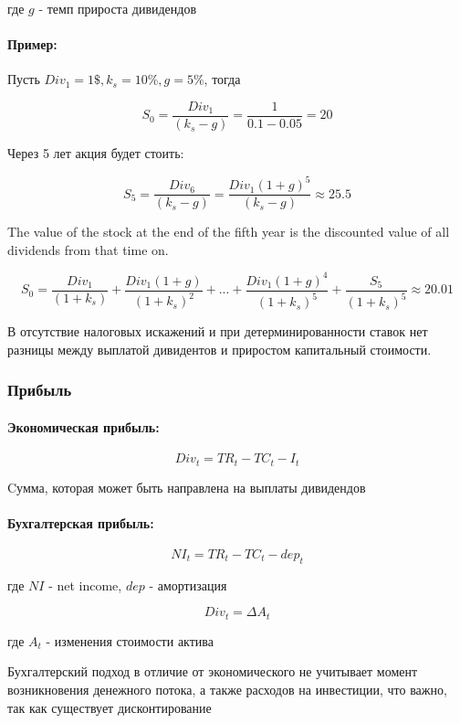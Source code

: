 \documentclass[a4paper,12pt]{article} %
\begin{document}
   где 
  $ g $  - темп  прироста дивидендов
  
  
  \paragraph{ Пример: }
  
  Пусть  $ Div_1 = 1 \$, k_s = 10 \%, g = 5 \%  $, тогда
  
   \[ S_0 = \dfrac{Div_1}{(k_s-g)} =  \dfrac{1 }{0.1-0.05} = 20 \]
  
  Через 5 лет акция будет стоить:
  
  \[ S_5 = \dfrac{Div_6}{(k_s-g)}  = \dfrac{Div_1(1+g)^5}{(k_s-g)}  \approx 25.5 \]
  
  The value of the stock at the end of the fifth year is the discounted value of all dividends
  from that time on.
  
  \[ S_0 =  \dfrac{Div_1}{(1 + k_s)} +  \dfrac{Div_1(1+g)}{(1+ k_s)^2} + ... +  \dfrac{Div_1(1+g)^4}{(1+ k_s)^5}  + \dfrac{S_5}{(1+ k_s)^5}  \approx 20.01 \]
  
  
  
  В отсутствие налоговых искажений и при  детерминированности ставок нет разницы между выплатой дивидентов и приростом капитальный стоимости.
  
  
  \subsubsection{Прибыль}
  
   \paragraph{Экономическая прибыль:  }
   
   \[ Div_t = TR_t - TC_t - I_t \]
   
    Cумма, которая может быть направлена на выплаты дивидендов
   
\paragraph{   Бухгалтерская прибыль: }
   
   \[ NI_t = TR_t - TC_t - dep_t \]

где $ NI $ - net income, $ dep $ -   
    амортизация 
    
    \[ Div_t = \Delta A_t\]
    
  где     $ A_t $ - 
    изменения стоимости актива 
    
    
   Бухгалтерский подход в отличие от экономического не учитывает момент возникновения денежного потока, а также расходов на инвестиции, что  важно, так как существует дисконтирование 
   
\end{document}
